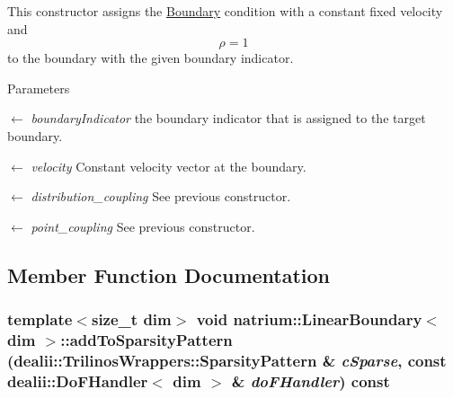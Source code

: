 This constructor assigns the \hyperlink{classnatrium_1_1Boundary}{Boundary} condition with a constant fixed velocity and \[ \rho = 1 \] to the boundary with the given boundary indicator. 
\begin{DoxyParams}{Parameters}
\item[\mbox{$\leftarrow$} {\em boundaryIndicator}]the boundary indicator that is assigned to the target boundary. \item[\mbox{$\leftarrow$} {\em velocity}]Constant velocity vector at the boundary. \item[\mbox{$\leftarrow$} {\em distribution\_\-coupling}]See previous constructor. \item[\mbox{$\leftarrow$} {\em point\_\-coupling}]See previous constructor. \end{DoxyParams}


\subsection{Member Function Documentation}
\hypertarget{classnatrium_1_1LinearBoundary_a1eaa444c487f30b0a2a284e7d9f4f92e}{
\subsubsection[{addToSparsityPattern}]{\setlength{\rightskip}{0pt plus 5cm}template$<$size\_\-t dim$>$ void {\bf natrium::LinearBoundary}$<$ dim $>$::addToSparsityPattern (dealii::TrilinosWrappers::SparsityPattern \& {\em cSparse}, \/  const dealii::DoFHandler$<$ dim $>$ \& {\em doFHandler}) const}}
\label{classnatrium_1_1LinearBoundary_a1eaa444c487f30b0a2a284e7d9f4f92e}


